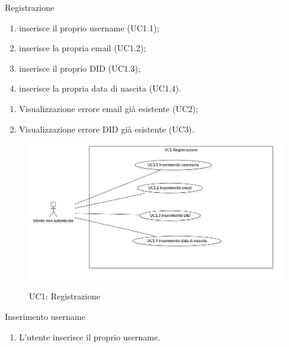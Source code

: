 \begin{usecase}{1}{Registrazione}\label{uc:registrazione}

\begin{enumerate}
  \item inserisce il proprio username (UC1.1);
  \item inserisce la propria email (UC1.2);
  \item inserisce il proprio DID (UC1.3);
  \item inserisce la propria data di nascita (UC1.4).
\end{enumerate}

\usecaseext{}
\begin{enumerate}
  \item Visualizzazione errore email già esistente (UC2);
  \item Visualizzazione errore DID già esistente (UC3).
\end{enumerate}
\end{usecase}

\begin{figure}[!h] 
  \centering 
  \includegraphics[width=0.9\columnwidth, alt={Caso d'uso relativo alla registrazione}]{immagini/usecase/UC1.jpg}
  \caption{UC1: Registrazione}\label{fig:uc:registrazione}
\end{figure}

\begin{usecase}{1.1}{Inserimento username}\label{uc:registrazione-username}
  \usecasemain{}
  
  \begin{enumerate}
    \item L'utente inserisce il proprio username.
  \end{enumerate}
  
\end{usecase}


